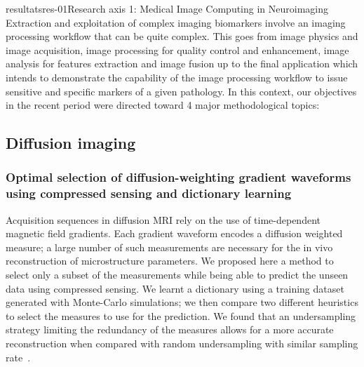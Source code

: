 \documentclass{ra2018}
\begin{document}
\begin{module}{resultats}{res-01}{Research axis 1: Medical Image Computing in Neuroimaging}
Extraction and exploitation of complex imaging biomarkers involve an imaging processing workflow that can be quite complex. This goes from image physics and image acquisition, image processing for quality control and enhancement, image analysis for features extraction and image fusion up to the final application which intends to demonstrate the capability of the image processing workflow to issue sensitive and specific markers of a given pathology. In this context, our objectives in the recent period were directed toward 4 major methodological topics:

\subsection{Diffusion imaging}

\subsubsection{Optimal selection of diffusion-weighting gradient waveforms using compressed sensing and dictionary learning}
\begin{participants}
\end{participants}
Acquisition sequences in diffusion MRI rely on the use of time-dependent magnetic field gradients. Each gradient waveform encodes a diffusion weighted measure; a large number of such measurements are necessary for the in vivo reconstruction of microstructure parameters. We proposed here a method to select only a subset of the measurements while being able to predict the unseen data using compressed sensing. We learnt a dictionary using a training dataset generated with Monte-Carlo simulations; we then compare two different heuristics to select the measures to use for the prediction. We found that an undersampling strategy limiting the redundancy of the measures allows for a more accurate reconstruction when compared with random undersampling with similar sampling rate~\cite{truffet:inserm-01939066}.


\end{module}
\end{document}
